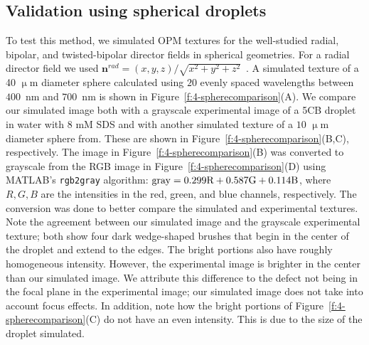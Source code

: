 \subsection{Validation using spherical droplets}
To test this method, we simulated OPM textures for the well-studied radial, bipolar, and twisted-bipolar director fields in spherical geometries.
For a radial director field we used $\mathbf{n}^{rad} = (x,y,z)/\sqrt{x^2+y^2+z^2}$~\cite{RN232}.
A simulated texture of a 40 $\upmu$m diameter sphere calculated using $20$ evenly spaced wavelengths between $400$~nm and $700$~nm is shown in Figure~\ref{f:4-spherecomparison}(A).
We compare our simulated image both with a grayscale experimental image of a 5CB droplet in water with 8 mM SDS and with another simulated texture of a $10$ $\upmu$m diameter sphere from.
These are shown in Figure~\ref{f:4-spherecomparison}(B,C), respectively.
The image in Figure~\ref{f:4-spherecomparison}(B) was converted to grayscale from the RGB image in Figure~\ref{f:4-spherecomparison}(D) using MATLAB's \texttt{rgb2gray} algorithm: ${\rm gray} = 0.299 \textrm{R} + 0.587 \textrm{G} + 0.114 \textrm{B}$, where $R,G,B$ are the intensities in the red, green, and blue channels, respectively.
The conversion was done to better compare the simulated and experimental textures.
Note the agreement between our simulated image and the grayscale experimental texture; both show four dark wedge-shaped brushes that begin in the center of the droplet and extend to the edges.
The bright portions also have roughly homogeneous intensity.
However, the experimental image is brighter in the center than our simulated image.
We attribute this difference to the defect not being in the focal plane in the experimental image; our simulated image does not take into account focus effects.
In addition, note how the bright portions of Figure~\ref{f:4-spherecomparison}(C) do not have an even intensity.
This is due to the size of the droplet simulated.

